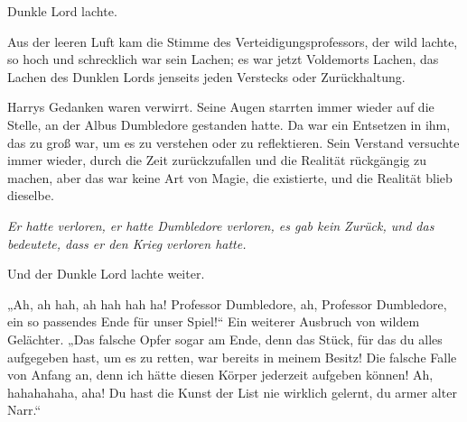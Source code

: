
 Dunkle Lord lachte.

\hplettrineextrapara
Aus der leeren Luft kam die Stimme des Verteidigungsprofessors, der wild lachte, so hoch und schrecklich war sein Lachen; es war jetzt Voldemorts Lachen, das Lachen des Dunklen Lords jenseits jeden Verstecks oder Zurückhaltung.

Harrys Gedanken waren verwirrt. Seine Augen starrten immer wieder auf die Stelle, an der Albus Dumbledore gestanden hatte. Da war ein Entsetzen in ihm, das zu groß war, um es zu verstehen oder zu reflektieren. Sein Verstand versuchte immer wieder, durch die Zeit zurückzufallen und die Realität rückgängig zu machen, aber das war keine Art von Magie, die existierte, und die Realität blieb dieselbe.

\emph{Er hatte verloren, er hatte Dumbledore verloren, es gab kein Zurück, und das bedeutete, dass er den Krieg verloren hatte.}

Und der Dunkle Lord lachte weiter.

„Ah, ah hah, ah hah hah ha! Professor Dumbledore, ah, Professor Dumbledore, ein so passendes Ende für unser Spiel!“
Ein weiterer Ausbruch von wildem Gelächter.
„Das falsche Opfer sogar am Ende, denn das Stück, für das du alles aufgegeben hast, um es zu retten, war bereits in meinem Besitz! Die falsche Falle von Anfang an, denn ich hätte diesen Körper jederzeit aufgeben können! Ah, hahahahaha, aha! Du hast die Kunst der List nie wirklich gelernt, du armer alter Narr.“

